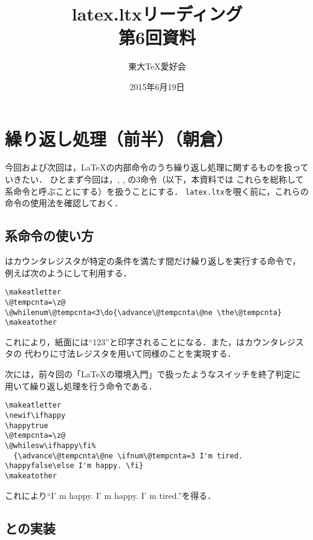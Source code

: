 \documentclass[autodetect-engine,dvipdfmx]{jsarticle}
\begin{document}
\title{ latex.ltxリーディング \\ 第6回資料 }
\author{ 東大\TeX 愛好会 }
\date{2015年6月19日}
\maketitle

\section{繰り返し処理（前半）（朝倉）}

今回および次回は，\LaTeX の内部命令のうち繰り返し処理に関するものを扱っていきたい．
ひとまず今回は，, , の3命令（以下，本資料では
これらを総称して系命令と呼ぶことにする）を扱うことにする．
\texttt{latex.ltx}を覗く前に，これらの命令の使用法を確認しておく．

\subsection{系命令の使い方}\label{while系命令の使い方}

はカウンタレジスタが特定の条件を満たす間だけ繰り返しを実行する命令で，
例えば次のようにして利用する．
%
\texsource
\begin{lstlisting}
\makeatletter
\@tempcnta=\z@
\@whilenum\@tempcnta<3\do{\advance\@tempcnta\@ne \the\@tempcnta}
\makeatother
\end{lstlisting}
%
これにより，紙面には``123''と印字されることになる．また，はカウンタレジスタの
代わりに寸法レジスタを用いて同様のことを実現する．

次には，前々回の「\LaTeX の環境入門」で扱ったようなスイッチを終了判定に
用いて繰り返し処理を行う命令である．
%
\begin{lstlisting}
\makeatletter
\newif\ifhappy
\happytrue
\@tempcnta=\z@
\@whilesw\ifhappy\fi%
  {\advance\@tempcnta\@ne \ifnum\@tempcnta=3 I'm tired. \happyfalse\else I'm happy. \fi}
\makeatother
\end{lstlisting}
%
これにより``I' m happy. I' m happy. I' m tired.''を得る．

\subsection{との実装}
\end{document}
